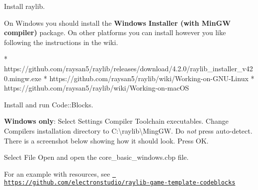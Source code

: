 
\begin{DoxyEnumerate}
\item Install raylib.
\end{DoxyEnumerate}

On Windows you should install the {\bfseries{Windows Installer (with Min\+GW compiler)}} package. On other platforms you can install however you like following the instructions in the wiki. \begin{DoxyVerb}* https://github.com/raysan5/raylib/releases/download/4.2.0/raylib_installer_v420.mingw.exe
* https://github.com/raysan5/raylib/wiki/Working-on-GNU-Linux
* https://github.com/raysan5/raylib/wiki/Working-on-macOS
\end{DoxyVerb}

\begin{DoxyEnumerate}
\item Install and run Code\+::\+Blocks.
\item {\bfseries{Windows only}}\+: Select {\ttfamily Settings} {\ttfamily Compiler} {\ttfamily Toolchain executables}. Change {\ttfamily Compiler\textquotesingle{}s installation directory} to {\ttfamily C\+:\textbackslash{}raylib\textbackslash{}Ming\+GW}. Do {\itshape not} press auto-\/detect. There is a screenshot below showing how it should look. Press {\ttfamily OK}.
\item Select {\ttfamily File} {\ttfamily Open} and open the {\ttfamily core\+\_\+basic\+\_\+windows.\+cbp} file.
\end{DoxyEnumerate}



For an example with resources, see \href{https://github.com/electronstudio/raylib-game-template-codeblocks}{\texttt{ https\+://github.\+com/electronstudio/raylib-\/game-\/template-\/codeblocks}} 